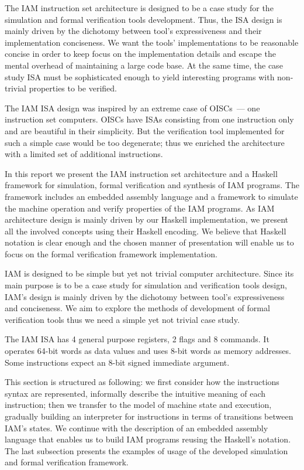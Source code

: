 The IAM instruction set architecture is designed to be a case study for
the simulation and formal verification tools development. Thus, the ISA design
is mainly driven by the dichotomy between tool's expressiveness and their
implementation conciseness.
We want the tools' implementations to be reasonable concise in order to keep
focus on the
implementation details and escape the mental overhead of maintaining a large
code base. At the same time, the case study ISA must be sophisticated enough to
yield interesting programs with non-trivial properties to be verified.

The IAM ISA design was inspired by an extreme case of OISCs~--- one instruction
set computers. OISCs have ISAs consisting from one instruction only and are
beautiful in their simplicity. But the verification tool implemented for such a
simple case would be too degenerate; thus we enriched the architecture with a
limited set of additional instructions.

In this report we present the IAM instruction set architecture and a Haskell
framework for simulation, formal verification and synthesis of IAM programs.
The framework includes an embedded assembly language and a framework to
simulate the machine operation and verify properties of the IAM programs. As
IAM architecture design is mainly driven by our Haskell implementation, we
present all the involved concepts using their Haskell encoding. We believe that
Haskell notation is clear enough and the chosen manner of presentation will
enable us to focus on the formal verification framework implementation.

IAM is designed to be simple but yet not trivial computer architecture. Since
its main purpose is to be a case study for simulation and verification tools
design, IAM's design is mainly driven by the dichotomy between tool's
expressiveness and conciseness. We aim to explore the methods of development of
formal verification tools thus we need a simple yet not trivial case study.

The IAM ISA has 4 general purpose registers, 2 flags and 8 commands. It
operates 64-bit words as data values and uses 8-bit words as memory addresses.
Some instructions expect an 8-bit signed immediate argument.

This section is structured as following: we first consider how the instructions
syntax are represented, informally describe the intuitive meaning of each
instruction; then we transfer to the model of machine state and execution,
gradually building an interpreter for instructions in terms of transitions
between IAM's states. We continue with the description of an embedded assembly
language that enables us to build IAM programs reusing the Haskell's notation.
The last subsection presents the examples of usage of the developed simulation
and formal verification framework.

